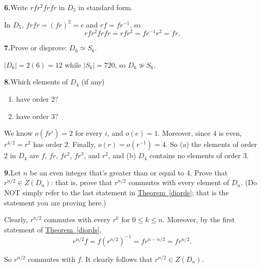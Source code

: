 \documentclass[10pt,]{book}
\theoremstyle{plain}
\theoremstyle{definition}
\theoremstyle{definition}
\theoremstyle{definition}
\theoremstyle{definition}
\numberwithin{equation}{section}
\begin{document}
\par\smallskip
\noindent\textbf{6.}\quad{}Write \(rfr^2frfr\) in \(D_5\) in standard form.%
\par\smallskip
In \(D_5\), \(frfr=(fr)^2=e\) and \(rf=fr^{-1}\), so%
\begin{equation*}
rfr^2frfr=rfr^2=fr^{-1}r^2=fr.
\end{equation*}
%
\par\smallskip
\noindent\textbf{7.}\quad{}Prove or disprove: \(D_6\simeq S_6\).%
\par\smallskip
\(|D_6|=2(6)=12\) while \(|S_6|=720\), so \(D_6\not\simeq S_6\).%
\par\smallskip
\noindent\textbf{8.}\quad{}Which elements of \(D_4\) (if any) \leavevmode%
\begin{enumerate}[label=(\alph*)]
\item\hypertarget{li-383}{}have order 2?%
\item\hypertarget{li-384}{}have order \(3\)?%
\end{enumerate}
%
\par\smallskip
We know \(o(fr^i)=2\) for every \(i\), and \(o(e)=1\). Moreover, since \(4\) is even, \(r^{4/2}=r^2\) has order 2. Finally, \(o(r)=o(r^{-1})=4\). So (a) the elements of order 2 in \(D_4\) are \(f\), \(fr\), \(fr^2\), \(fr^3\), and \(r^2\), and (b) \(D_4\) contains no elements of order 3.%
\par\smallskip
\noindent\textbf{9.}\quad{}Let \(n\) be an even integer that's greater than or equal to 4. Prove that \(r^{n/2}\in Z(D_n)\): that is, prove that \(r^{n/2}\) commutes with every element of \(D_n\). (Do NOT simply refer to the last statement in \hyperref[diords]{Theorem~\ref{diords}}; that is the statement you are proving here.)%
\par\smallskip
Clearly, \(r^{n/2}\) commutes with every \(r^k\) for \(0\leq k\leq n\). Moreover, by the first statement of \hyperref[diords]{Theorem~\ref{diords}},%
\begin{equation*}
r^{n/2}f=f(r^{n/2})^{-1}=fr^{n-n/2}=fr^{n/2}.
\end{equation*}
%
\par
So \(r^{n/2}\) commutes with \(f\). It clearly follows that \(r^{n/2}\in Z(D_n)\).%
\par\smallskip
\end{document}
